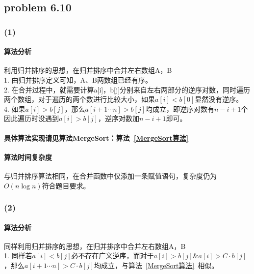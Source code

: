 \documentclass[11pt]{ctexart}
\begin{document}
	\subsection*{problem 6.10}
	\subsubsection*{(1)}
	\paragraph{算法分析}利用归并排序的思想，在归并排序中合并左右数组A，B\\
	\hspace*{20pt}1. 由归并排序定义可知，A、B两数组已经有序。\\
	\hspace*{20pt}2. 在合并过程中，就需要计算a[i]，b[j]分别来自左右两部分的逆序对数，同时遍历两个数组，对于遍历的两个数进行比较大小，如果$a[i]<b[0]$显然没有逆序。\\
	\hspace*{20pt}4. 如果$a[i]>b[j]$，那么$a[i+1\cdots n]>b[j]$均成立，即逆序对数有$n-i+1$个
	因此遍历时没遇到$a[i]>b[j]$，逆序对数加$n-i+1$即可。
	\paragraph{具体算法实现请见算法MergeSort：算法~\ref{MergeSort算法}}
	\paragraph{算法时间复杂度}与归并排序算法相同，在合并函数中仅添加一条赋值语句，复杂度仍为$O(n\log n)$符合题目要求。
	\subsubsection*{(2)}
	\paragraph{算法分析}同样利用归并排序的思想，在归并排序中合并左右数组A，B\\
	\hspace*{20pt}1. 同样若$a[i]<b[j]$必不存在广义逆序，而对于$a[i]>b[j]\&a[i]>C\cdot b[j]$，那么$a[i+1\cdots n]>C\cdot b[j]$均成立，与算法~\ref{MergeSort算法}\ 相似。
\end{document}
